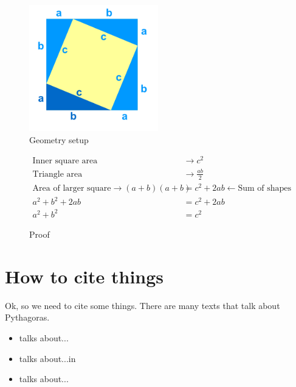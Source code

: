 \documentclass{article}
\begin{document}
    \begin{figure}
        \centering
        \includegraphics[width=0.5\textwidth]{img/pythag.png}
        \caption{Geometry setup}
        \label{fig:pythag-image}
    \end{figure}

    \begin{figure}
        \begin{align*}
            \text{Inner square area} &\rightarrow c^2\\
            \text{Triangle area} &\rightarrow \frac{ab}{2}\\
            \text{Area of larger square}\rightarrow(a+b)(a+b) &= c^2 + 2ab \leftarrow\text{Sum of shapes}\\
            a^2 + b^2 + 2ab &=  c^2 + 2ab\\
            a^2 + b^2 &=  c^2
        \end{align*}
        \caption{Proof}
        \label{fig:pythag-working}
    \end{figure}

    \section*{How to cite things}  %
    Ok, so we need to cite some things. There are many texts that talk about Pythagoras\cite{Fauvel2009,Huffman2018,Joost2009}.

    \begin{itemize}
        \item \citeauthor{Fauvel2009} talks about...
        \item \citeauthor{Huffman2018} talks about...in
        \item \citeauthor{Joost2009} talks about...
    \end{itemize}
    
\end{document}
